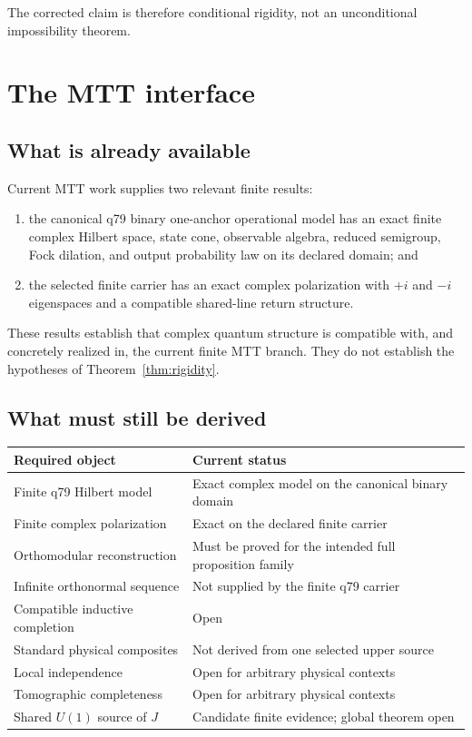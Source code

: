 \documentclass[11pt]{article}
\begin{document}
The corrected claim is therefore conditional rigidity, not an unconditional impossibility theorem.

\section{The MTT interface}

\subsection{What is already available}

Current MTT work supplies two relevant finite results:
\begin{enumerate}
\item the canonical q79 binary one-anchor operational model has an exact finite complex Hilbert space, state cone, observable algebra, reduced semigroup, Fock dilation, and output probability law on its declared domain; and
\item the selected finite carrier has an exact complex polarization with
\(+i\) and \(-i\) eigenspaces and a compatible shared-line return structure.
\end{enumerate}
These results establish that complex quantum structure is compatible with, and concretely realized in, the current finite MTT branch. They do not establish the hypotheses of Theorem~\ref{thm:rigidity}.

\subsection{What must still be derived}

\begin{center}
\begin{tabular}{p{}p{}}
\hline
Required object & Current status\\
\hline
Finite q79 Hilbert model & Exact complex model on the canonical binary domain\\
Finite complex polarization & Exact on the declared finite carrier\\
Orthomodular reconstruction & Must be proved for the intended full proposition family\\
Infinite orthonormal sequence & Not supplied by the finite q79 carrier\\
Compatible inductive completion & Open\\
Standard physical composites & Not derived from one selected upper source\\
Local independence & Open for arbitrary physical contexts\\
Tomographic completeness & Open for arbitrary physical contexts\\
Shared \(U(1)\) source of \(J\) & Candidate finite evidence; global theorem open\\
\hline
\end{tabular}
\end{center}
\end{document}
